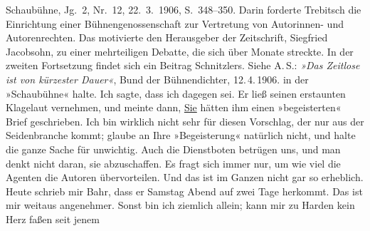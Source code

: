 \begin{ledgroupsized}[t]{13cm}
{{{{                        Schaubühne}, Jg. 2, Nr. 12, 22. 3. 1906,
                     S. 348–350. Darin forderte Trebitsch die Einrichtung einer Bühnengenossenschaft zur Vertretung von
                  Autorinnen- und Autorenrechten. Das motivierte den Herausgeber der Zeitschrift, Siegfried Jacobsohn, zu einer mehrteiligen Debatte, die
                  sich über Monate streckte. In der zweiten Fortsetzung findet sich ein Beitrag Schnitzlers. Siehe A. S.: \emph{»Das Zeitlose ist von kürzester Dauer«}, Bund der Bühnendichter, 12. 4. 1906.}}}\label{K_L03416-5h} in der »Schaubühne« halte. Ich sagte, dass ich dagegen
               sei. Er ließ seinen erstaunten Klagelaut vernehmen, und meinte dann, {\pb}\uline{Sie} hätten ihm einen »begeisterten« Brief geschrieben. Ich bin wirklich
               nicht sehr für diesen Vorschlag, der nur aus der Seidenbranche kommt; glaube an Ihre
               »Begeisterung« natürlich nicht, und halte die ganze Sache für unwichtig. Auch die
               Dienstboten betrügen uns, und man denkt nicht daran, sie abzuschaffen. Es fragt sich
               immer nur, um wie viel die Agenten die Autoren übervorteilen. Und das ist im Ganzen
               nicht gar so erheblich.\pend
           \pstart
           Heute schrieb mir Bahr, dass er Samstag{ }Abend auf zwei Tage herkommt. Das ist mir weitaus angenehmer. Sonst bin ich ziemlich allein;
               kann mir zu Harden kein Herz faßen seit jenem

\end{ledgroupsized}
